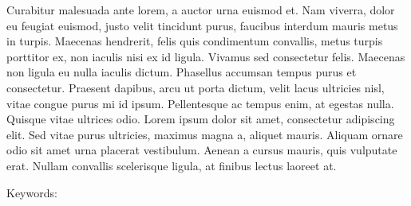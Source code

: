 Curabitur malesuada ante lorem, a auctor urna euismod et. Nam viverra, dolor eu feugiat euismod, justo velit tincidunt purus, faucibus interdum mauris metus in turpis. Maecenas hendrerit, felis quis condimentum convallis, metus turpis porttitor ex, non iaculis nisi ex id ligula. Vivamus sed consectetur felis. Maecenas non ligula eu nulla iaculis dictum. Phasellus accumsan tempus purus et consectetur. Praesent dapibus, arcu ut porta dictum, velit lacus ultricies nisl, vitae congue purus mi id ipsum. Pellentesque ac tempus enim, at egestas nulla. Quisque vitae ultrices odio. Lorem ipsum dolor sit amet, consectetur adipiscing elit. Sed vitae purus ultricies, maximus magna a, aliquet mauris. Aliquam ornare odio sit amet urna placerat vestibulum. Aenean a cursus mauris, quis vulputate erat. Nullam convallis scelerisque ligula, at finibus lectus laoreet at. 

\noindent Keywords: